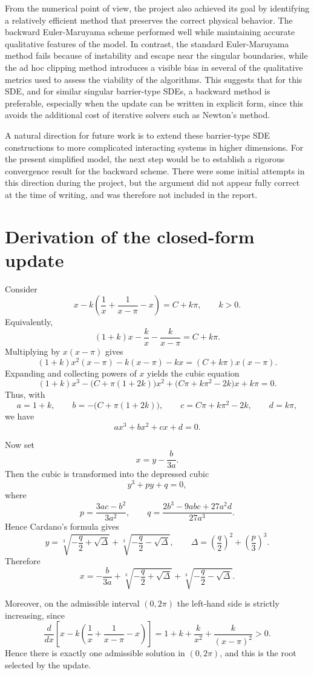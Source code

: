 \documentclass[11pt]{article}
\newcommand{\1}{\mathbbm{1}}
\theoremstyle{plain}
\theoremstyle{definition}
\theoremstyle{remark}
\begin{document}
From the numerical point of view, the project also achieved its goal by identifying a relatively efficient method that preserves the correct physical behavior. The backward Euler-Maruyama scheme performed well while maintaining accurate qualitative features of the model. In contrast, the standard Euler-Maruyama method fails because of instability and escape near the singular boundaries, while the ad hoc clipping method introduces a visible bias in several of the qualitative metrics used to assess the viability of the algorithms. This suggests that for this SDE, and for similar singular barrier-type SDEs, a backward method is preferable, especially when the update can be written in explicit form, since this avoids the additional cost of iterative solvers such as Newton's method.

A natural direction for future work is to extend these barrier-type SDE constructions to more complicated interacting systems in higher dimensions. For the present simplified model, the next step would be to establish a rigorous convergence result for the backward scheme. There were some initial attempts in this direction during the project, but the argument did not appear fully correct at the time of writing, and was therefore not included in the report.

\newpage





\appendix

\newpage
\section{Derivation of the closed-form update}
\label{sec:closed_form_update}
Consider
\[
x-k\!\left(\frac{1}{x}+\frac{1}{x-\pi}-x\right)=C+k\pi,
\qquad k>0.
\]
Equivalently,
\[
(1+k)x-\frac{k}{x}-\frac{k}{x-\pi}=C+k\pi.
\]
Multiplying by $x(x-\pi)$ gives
\[
(1+k)x^2(x-\pi)-k(x-\pi)-kx=(C+k\pi)x(x-\pi).
\]
Expanding and collecting powers of $x$ yields the cubic equation
\[
(1+k)x^3-\bigl(C+\pi(1+2k)\bigr)x^2+\bigl(C\pi+k\pi^2-2k\bigr)x+k\pi=0.
\]
Thus, with
\[
a=1+k,\qquad
b=-\bigl(C+\pi(1+2k)\bigr),\qquad
c=C\pi+k\pi^2-2k,\qquad
d=k\pi,
\]
we have
\[
ax^3+bx^2+cx+d=0.
\]

Now set
\[
x=y-\frac{b}{3a}.
\]
Then the cubic is transformed into the depressed cubic
\[
y^3+py+q=0,
\]
where
\[
p=\frac{3ac-b^2}{3a^2},
\qquad
q=\frac{2b^3-9abc+27a^2d}{27a^3}.
\]
Hence Cardano's formula gives
\[
y=
\sqrt[3]{-\frac{q}{2}+\sqrt{\Delta}}
+
\sqrt[3]{-\frac{q}{2}-\sqrt{\Delta}},
\qquad
\Delta=\left(\frac{q}{2}\right)^2+\left(\frac{p}{3}\right)^3.
\]
Therefore
\[
x=
-\frac{b}{3a}
+\sqrt[3]{-\frac{q}{2}+\sqrt{\Delta}}
+\sqrt[3]{-\frac{q}{2}-\sqrt{\Delta}}.
\]

Moreover, on the admissible interval $(0,2\pi)$ the left-hand side is strictly increasing, since
\[
\frac{d}{dx}\!\left[x-k\!\left(\frac{1}{x}+\frac{1}{x-\pi}-x\right)\right]
=
1+k+\frac{k}{x^2}+\frac{k}{(x-\pi)^2}>0.
\]
Hence there is exactly one admissible solution in $(0,2\pi)$, and this is the root selected by the update.
\end{document}
